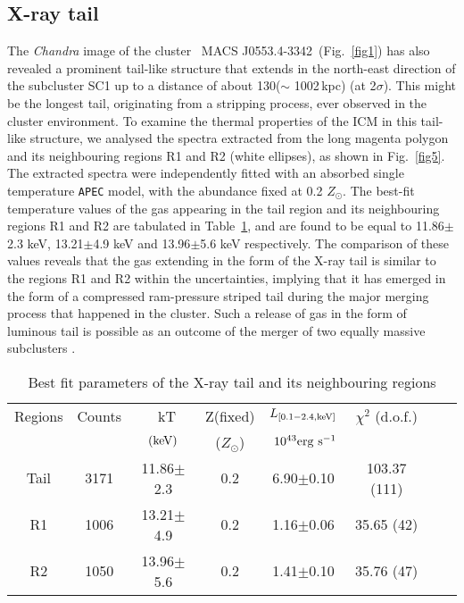 \documentclass[useASM,usenatbib]{mn2e}
\newcommand{\mac}{\rm~MACS J0553.4-3342}
\begin{document}
\subsection{X-ray tail}
The {\it Chandra} image of the cluster \mac~(Fig.~\ref{fig1}) has also
revealed a prominent tail-like structure that extends in the north-east
direction of the subcluster SC1 up to a distance of about
130\arcsec($\sim$ 1002\,kpc) (at 2$\sigma$). This might be the longest
tail, originating from a stripping process, ever observed in the cluster
environment. To examine the thermal properties of the
ICM in this tail-like structure, we analysed the spectra
extracted from the long magenta polygon
and its neighbouring regions R1 and R2 (white ellipses), as shown in
Fig.~\ref{fig5}. The extracted spectra were independently fitted with an absorbed single temperature {\tt APEC} model, with the abundance
fixed at 0.2 $Z_{\odot}$. The best-fit temperature values of the gas
appearing in the tail region and its neighbouring regions R1 and R2 are tabulated in Table~\ref{tail}, and are found to be equal to
11.86$\pm$2.3 keV, 13.21$\pm$4.9 keV and 13.96$\pm$5.6 keV
respectively. The comparison of these values reveals that the gas extending in the form of the X-ray tail is similar to the regions R1 and R2 within the uncertainties, implying that it has emerged in the form of a compressed ram-pressure striped tail during the major merging process that happened in the cluster. Such a release of gas in the form of luminous tail is possible as an outcome of the merger of two equally massive subclusters \citep{2004ApJ...608..179R,2014A&A...570A.119E,2015A&A...583L...2S}.


\begin{table}
\tiny
\centering
\caption{Best fit parameters of the X-ray tail and its neighbouring regions}
\begin{tabular}{cccccccc}
\hline
Regions & Counts& {~\rm kT}               &Z(fixed)           & $L_{[0.1-2.4\rm,keV]}$ &\(\chi^2\) (d.o.f.)   \\
      &        & \(\mbox{\rm(keV)}\)  & ($Z_{\odot}$)  & ${~\rm 10^{43}erg~s^{-1}}$&         \\
\hline
Tail & 3171   & 11.86$\pm$2.3 & 	0.2       & 6.90$\pm$0.10     & 103.37 (111)  \\
R1   & 1006   & 13.21$\pm$4.9 & 	0.2       & 1.16$\pm$0.06    & 35.65 (42)  \\
R2   & 1050   & 13.96$\pm$5.6 &    	0.2       & 1.41$\pm$0.10    & 35.76 (47)  \\
\hline
\end{tabular}
\label{tail}
\end{table}
\end{document}
